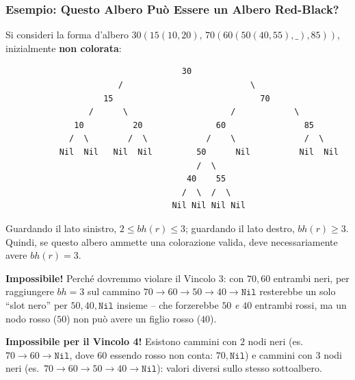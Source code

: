 \documentclass[12pt, a4paper]{article}
\begin{document}
\subsubsection{Esempio: Questo Albero Può Essere un Albero Red-Black?}

Si consideri la forma d'albero $30(15(10,20),\,70(60(50(40,55),\_),85))$, inizialmente \textbf{non colorata}:

\begin{verbatim}
                                    30
                       /                          \
                    15                              70
                 /      \                     /            \
              10          20               60                85
             /  \        /  \            /    \              /  \
           Nil  Nil   Nil  Nil         50      Nil          Nil  Nil
                                       /  \
                                     40    55
                                    /  \  /  \
                                  Nil Nil Nil Nil
\end{verbatim}

\begin{tcolorbox}[colback=lightergray!5, colframe=tocsubsec, title=\textbf{Passo 1: un Vincolo sulla Possibile Altezza Nera}]
Guardando il lato sinistro, $2\le bh(r)\le 3$; guardando il lato destro, $bh(r)\ge 3$. Quindi, se questo albero ammette una colorazione valida, deve necessariamente avere $bh(r)=3$.
\end{tcolorbox}

\begin{tcolorbox}[colback=lightergray!5, colframe=tocsubsec, title=\textbf{Tentativo 1: $60$ e $70$ Entrambi Neri}]
\textbf{Impossibile!} Perché dovremmo violare il Vincolo 3: con $70,60$ entrambi neri, per raggiungere $bh=3$ sul cammino $70\to60\to50\to40\to\texttt{Nil}$ resterebbe un solo ``slot nero'' per $50,40,\texttt{Nil}$ insieme -- che forzerebbe $50$ \emph{e} $40$ entrambi rossi, ma un nodo rosso ($50$) non può avere un figlio rosso ($40$).
\end{tcolorbox}

\begin{tcolorbox}[colback=lightergray!5, colframe=tocsubsec, title=\textbf{Tentativo 2: $60$ Rosso}]
\textbf{Impossibile per il Vincolo 4!} Esistono cammini con $2$ nodi neri (es.\ $70\to60\to\texttt{Nil}$, dove $60$ essendo rosso non conta: $70,\texttt{Nil}$) e cammini con $3$ nodi neri (es.\ $70\to60\to50\to40\to\texttt{Nil}$): valori diversi sullo stesso sottoalbero.
\end{tcolorbox}
\end{document}
